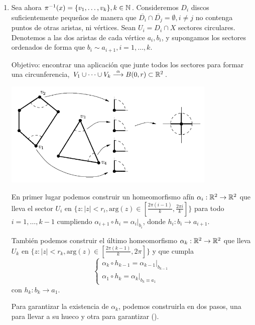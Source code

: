{\begin{enumerate}
        \item Sea ahora $\pi^{-1}(x) = \{v_1, \dots, v_k\}, k \in \mathbb{N}$. Consideremos $D_i$ discos suficientemente pequeños de manera que $\overline{D_i} \cap \overline{D_j} = \emptyset, i \neq j$ no contenga puntos de otras aristas, ni vértices. 
        Sean $U_i = D_i \cap X$ sectores circulares. Denotemos a las dos aristas de cada vértice $a_i,b_i$, y supongamos los sectores ordenados de forma que $b_i \sim a_{i+1}, i=1,\dots,k$.

        Objetivo: encontrar una aplicación que junte todos los sectores para formar una circunferencia, $V_1 \cup \dots \cup V_k \overset{\alpha}{\longrightarrow} B(0,r) \subset \mathbb{R}^2$. 
        
        \begin{center}
            \includegraphics[width=0.8\textwidth]{img/entornos-vertices.png}
        \end{center}

        En primer lugar podemos construir un homeomorfismo afín $\alpha_i : \mathbb{R}^2 \to \mathbb{R}^2$ que lleva el sector $U_i$ en $\{z : |z| < r_i, \text{arg}(z) \in [\frac{2\pi(i-1)}{k}, \frac{2\pi i}{k}]\}$ para todo $i=1,\dots,k-1$ cumpliendo $\alpha_{i+1} \circ h_i = \alpha_i|_{b_i}$, donde $h_i : b_i \to a_{i+1}$.
        
        También podemos construir el último homeomorfismo $\alpha_k : \mathbb{R}^2 \to \mathbb{R}^2$ que lleva $U_k$ en $\{z : |z| < r_k, \text{arg}(z) \in [\frac{2\pi(k-1)}{k}, 2\pi]\}$ y que cumpla 
        \begin{equation*}
            \begin{cases}
                \alpha_k \circ h_{k-1} = \alpha_{k-1}|_{b_{k-1}} \\
                \alpha_1 \circ h_k = \alpha_k|_{b_k \equiv a_1}
            \end{cases} \tag{\star}
        \end{equation*}
        con $h_k : b_k \to a_1$.
        
        Para garantizar la existencia de $\alpha_k$, podemos construirla en dos pasos, una para llevar a su hueco y otra para garantizar (\star). 


\end{enumerate}}
